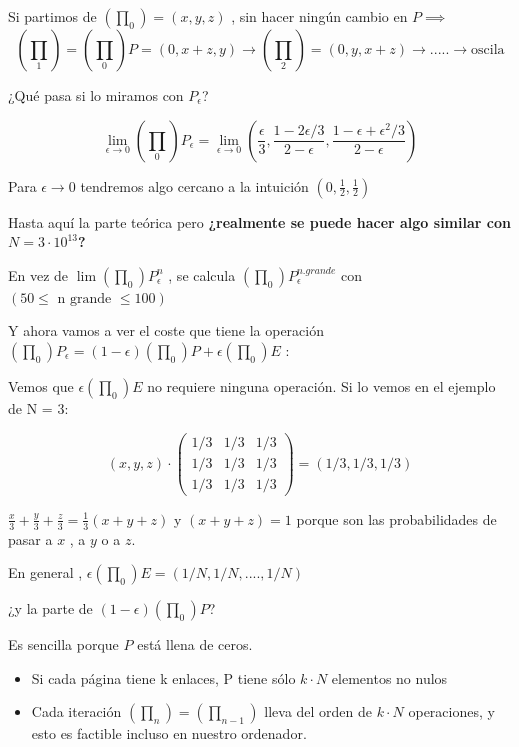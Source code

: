 \begin{example}
Si partimos de $\left(\prod_0\right)= \left(x,y,z\right)$ , sin hacer ningún cambio en $P \implies$
$$\left(\prod_1\right) = \left(\prod_0\right)P = \left(0,x+z,y\right)\rightarrow \left(\prod_2\right) = \left(0,y,x+z\right) \rightarrow ..... \rightarrow \text{oscila}$$

¿Qué pasa si lo miramos con $P_{\epsilon}$?

$$\lim\limits_{\epsilon \rightarrow 0} \left(\prod_0\right)P_{\epsilon} = \lim\limits_{\epsilon \rightarrow 0}\left(\frac{\epsilon}{3}, \frac{1- 2\epsilon/3}{2-\epsilon}, \frac{1-\epsilon +  \epsilon^2/3}{2- \epsilon}\right)$$

Para $\epsilon \rightarrow 0$ tendremos algo cercano a la intuición $\left(0, \frac{1}{2}, \frac{1}{2}\right)$
\end{example}


Hasta aquí la parte teórica pero \textbf{¿realmente se puede hacer algo similar con $N = 3\cdot 10^{13}$?}

En vez de $\lim\left(\prod_0\right)P_{\epsilon}^n$ , se calcula $\left(\prod_0\right)P_{\epsilon}^{n.grande} $ con $\left(50 \leq \text{ n grande }\leq 100\right)$

Y ahora vamos a ver el coste que tiene la operación $\left(\prod_0\right)P_{\epsilon} = \left(1-\epsilon\right)\left(\prod_0\right)P + \epsilon\left(\prod_0\right)E$ :

Vemos que $\epsilon\left(\prod_0\right)E$ no requiere ninguna operación. Si lo vemos en el ejemplo de N = 3:

$$(x , y , z)\cdot \left( \begin{array}{ccc}
1/3 & 1/3 & 1/3 \\
1/3 & 1/3 & 1/3 \\
1/3 & 1/3 & 1/3 \end{array} \right) = (1/3 , 1/3 , 1/3)$$

\obs $\frac{x}{3} + \frac{y}{3} + \frac{z}{3} = \frac{1}{3}(x + y + z)$ y $(x +y +z)=1$ porque son las probabilidades de pasar a $x$ , a $y$ o a $z$.

En general , $\epsilon(\prod_0)E = (1/N , 1/N, ....,1/N)$

¿y la parte de $(1-\epsilon)(\prod_0)P$?

Es sencilla porque $P$ está llena de ceros.
\begin{itemize}
	\item Si cada página tiene k enlaces, P tiene sólo $k\cdot N$ elementos no nulos
	\item Cada iteración $(\prod_n) =(\prod_{n-1})$ lleva del orden de $k\cdot N$ operaciones, y esto es factible incluso en nuestro ordenador.
\end{itemize}


